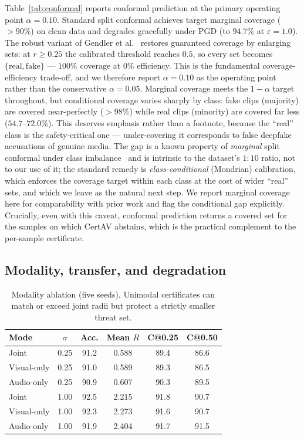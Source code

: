 Table~\ref{tab:conformal} reports conformal prediction at the primary operating point $\alpha=0.10$. Standard split conformal achieves target marginal coverage ($>90\%$) on clean data and degrades gracefully under PGD (to $94.7\%$ at $\varepsilon=1.0$). The robust variant of Gendler et al.~\cite{gendler2022adversarially} restores guaranteed coverage by enlarging sets: at $r\ge 0.25$ the calibrated threshold reaches $0.5$, so every set becomes $\{\text{real},\text{fake}\}$ --- $100\%$ coverage at $0\%$ efficiency. This is the fundamental coverage-efficiency trade-off, and we therefore report $\alpha=0.10$ as the operating point rather than the conservative $\alpha=0.05$. Marginal coverage meets the $1-\alpha$ target throughout, but conditional coverage varies sharply by class: fake clips (majority) are covered near-perfectly ($>98\%$) while real clips (minority) are covered far less ($54.7$--$72.0\%$). This deserves emphasis rather than a footnote, because the ``real'' class is the safety-critical one --- under-covering it corresponds to false deepfake accusations of genuine media. The gap is a known property of \emph{marginal} split conformal under class imbalance~\cite{romano2020classification} and is intrinsic to the dataset's $1{:}10$ ratio, not to our use of it; the standard remedy is \emph{class-conditional} (Mondrian) calibration, which enforces the coverage target within each class at the cost of wider ``real'' sets, and which we leave as the natural next step. We report marginal coverage here for comparability with prior work and flag the conditional gap explicitly. Crucially, even with this caveat, conformal prediction returns a covered set for the samples on which CertAV abstains, which is the practical complement to the per-sample certificate.

\subsection{Modality, transfer, and degradation}

\begin{table}[t]
\centering
\caption{Modality ablation (five seeds). Unimodal certificates can match or exceed joint radii but protect a strictly smaller threat set.}
\label{tab:modality}
\footnotesize
\setlength{\tabcolsep}{4pt}
\begin{tabular}{lccccc}
\toprule
Mode & $\sigma$ & Acc. & Mean $R$ & C@0.25 & C@0.50 \\
\midrule
Joint       & 0.25 & 91.2 & 0.588 & 89.4 & 86.6 \\
Visual-only & 0.25 & 91.0 & 0.589 & 89.3 & 86.5 \\
Audio-only  & 0.25 & 90.9 & 0.607 & 90.3 & 89.5 \\
\midrule
Joint       & 1.00 & 92.5 & 2.215 & 91.8 & 90.7 \\
Visual-only & 1.00 & 92.3 & 2.273 & 91.6 & 90.7 \\
Audio-only  & 1.00 & 91.9 & 2.404 & 91.7 & 91.5 \\
\bottomrule
\end{tabular}
\end{table}

